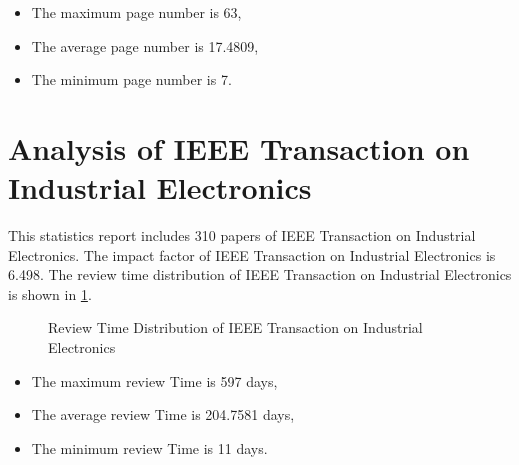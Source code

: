 \documentclass[12pt,
               a4paper,
               journal,
               onecolumn]{IEEEtran}
\begin{document}
\begin{itemize}
  \item The maximum page number is 63,
  \item The average page number is 17.4809,
  \item The minimum page number is 7.
\end{itemize}

\section{Analysis of IEEE Transaction on Industrial Electronics}
This statistics report includes 310 papers of IEEE Transaction on Industrial Electronics. The impact factor of IEEE Transaction on Industrial Electronics is 6.498. The review time distribution of IEEE Transaction on Industrial Electronics is shown in \cref{fig:Review Time Distribution of IEEE Transaction on Industrial Electronics}.
\begin{figure}[htb]
  \centering
  \caption{Review Time Distribution of IEEE Transaction on Industrial Electronics}
  \label{fig:Review Time Distribution of IEEE Transaction on Industrial Electronics}
\end{figure}

\begin{itemize}
  \item The maximum review Time is 597 days,
  \item The average review Time is 204.7581 days,
  \item The minimum review Time is 11 days.
\end{itemize}
\end{document}
